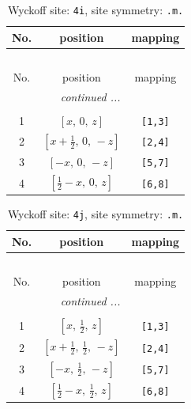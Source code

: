 \documentclass[fleqn,8pt]{jsarticle}
\begin{document}
\renewcommand{\arraystretch}{1.2}
\begin{longtable}{ccc}
\caption{Wyckoff site: {\tt 4i}, site symmetry: {\tt .m.}}
 \\
 \hline \hline
No. & position & mapping \\ \hline \endfirsthead

\multicolumn{2}{l}{\tablename\ \thetable{}} \\
 \hline \hline
No. & position & mapping \\ \hline \endhead

 \hline \hline
\multicolumn{2}{r}{\footnotesize\it continued ...} \\ \endfoot

 \hline \hline
\multicolumn{2}{r}{} \\ \endlastfoot

1 & $\left[ x,\, 0,\, z \right]$ & {\tt [1,3]} \\ \hline
2 & $\left[ x + \frac{1}{2},\, 0,\, - z \right]$ & {\tt [2,4]} \\ \hline
3 & $\left[ - x,\, 0,\, - z \right]$ & {\tt [5,7]} \\ \hline
4 & $\left[ \frac{1}{2} - x,\, 0,\, z \right]$ & {\tt [6,8]} \\
\end{longtable}
\renewcommand{\arraystretch}{1.2}
\begin{longtable}{ccc}
\caption{Wyckoff site: {\tt 4j}, site symmetry: {\tt .m.}}
 \\
 \hline \hline
No. & position & mapping \\ \hline \endfirsthead

\multicolumn{2}{l}{\tablename\ \thetable{}} \\
 \hline \hline
No. & position & mapping \\ \hline \endhead

 \hline \hline
\multicolumn{2}{r}{\footnotesize\it continued ...} \\ \endfoot

 \hline \hline
\multicolumn{2}{r}{} \\ \endlastfoot

1 & $\left[ x,\, \frac{1}{2},\, z \right]$ & {\tt [1,3]} \\ \hline
2 & $\left[ x + \frac{1}{2},\, \frac{1}{2},\, - z \right]$ & {\tt [2,4]} \\ \hline
3 & $\left[ - x,\, \frac{1}{2},\, - z \right]$ & {\tt [5,7]} \\ \hline
4 & $\left[ \frac{1}{2} - x,\, \frac{1}{2},\, z \right]$ & {\tt [6,8]} \\
\end{longtable}
\end{document}

